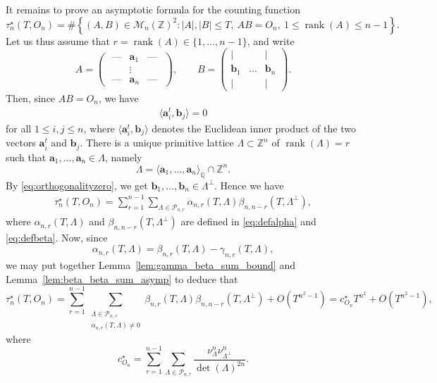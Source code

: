 \documentclass[11pt,reqno]{amsart}
\theoremstyle{definition}
\theoremstyle{remark}
\numberwithin{equation}{section}
\numberwithin{thm}{section}
\numberwithin{table}{section}
\def \Q {{\mathbb Q}}
\def \Z {{\mathbb Z}}
\def\a{\mathbf{a}}
\def\b{\mathbf{b}}
\DeclareMathOperator{\rank}{rank}
\begin{document}
    It remains to prove an asymptotic formula for the counting function 
    \[
    \tau_n^\star(T,O_n) =\#\left\{(A,B)\in \mathcal{M}_n(\Z)^2: |A|,|B|\leq T, ~AB=O_n,~1\le\rank(A)\le n-1
\right\}.
    \]
    Let us thus assume that $r = \rank(A) \in \{ 1, \ldots, n-1\}$, and write 
    \[
    A = \begin{pmatrix}
        \textbf{ ---} & \a_1 & \textbf{--- } \\
         \textbf{ } & \vdots & \textbf{ } \\
          \text{ ---} & \a_n & \textbf{--- } 
    \end{pmatrix},  \qquad  
    B = 
    \begin{pmatrix}
        \vert & \text{ } & \vert \\
        \b_1 & \hdots & \b_n \\ 
         \vert & \text{ } & \vert 
    \end{pmatrix}.
    \]
    Then, since $AB = O_n$, we have 
    \begin{align}\label{eq:orthogonalityzero}
         \langle \a_i^t, \b_j
    \rangle = 0
    \end{align}
    for all $1 \le i,j \le n$, where $\langle \a_i^t, \b_j
    \rangle$ denotes the Euclidean inner product of the two vectors $\a_i^t$ and $\b_j$.
    There is a unique primitive lattice $\Lambda \subset \Z^n$ of $\rank(\Lambda) = r$ such that $\a_1, \ldots, \a_n \in \Lambda$, namely 
    \[
    \Lambda = \langle 
    \a_1, \ldots, \a_n \rangle_{\Q}\cap \Z^n.\]
    By \eqref{eq:orthogonalityzero}, we get $\b_1, \ldots, \b_n \in \Lambda^{\perp}$. 
    Hence we have 
    \begin{align*}
        \tau^\star_n (T, O_n) = \sum_{r=1}^{n-1} \sum_{\Lambda \in \mathcal{P}_{n,r}} 
    \alpha_{n,r} (T, \Lambda) \beta_{n,n-r} (T, \Lambda^\perp),
    \end{align*}
    where $\alpha_{n,r}(T, \Lambda)$  and $\beta_{n,n-r}(T, \Lambda^\perp)$ are defined in \eqref{eq:defalpha} and \eqref{eq:defbeta}. Now, since 
    $$\alpha_{n,r}(T,\Lambda) = \beta_{n,r}(T,\Lambda) - \gamma_{n,r}(T,\Lambda),
    $$ 
    we may put together  Lemma~\ref{lem:gamma_beta_sum_bound} and Lemma~\ref{lem:beta_beta_sum_asymp} to deduce that 
    \[
    \tau^\star_n (T, O_n) = \sum_{r=1}^{n-1} \sum_{\substack{\Lambda \in \mathcal{P}_{n,r} \\
    \alpha_{n,r}(T,\Lambda)\neq 0}} 
    \beta_{n,r} (T, \Lambda) \beta_{n,n-r} (T, \Lambda^\perp) + O(T^{n^2-1}) = c_{O_n}^\star T^{n^2} + O(T^{n^2-1}),
    \]
    where 
    \[
    c_{O_n}^\star = \sum_{r=1}^{n-1} 
     \sum_{\Lambda \in \mathcal{P}_{n,r}}
     \frac{\nu_{\Lambda}^n\nu_{\Lambda^\perp}^n}
    {\det(\Lambda)^{2n}}.
    \]
\end{document}
